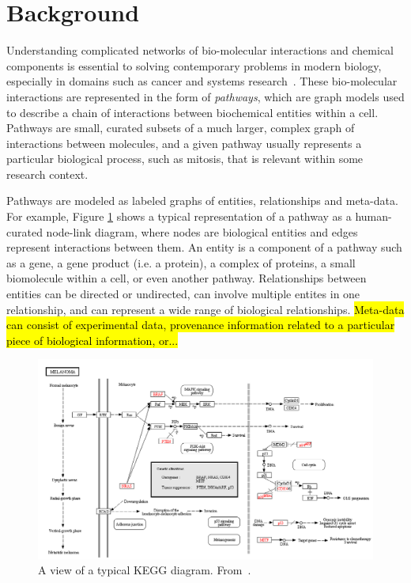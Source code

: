 \section*{Background}

Understanding complicated networks of bio-molecular interactions and chemical components is essential to solving contemporary problems in modern biology, especially in domains such as cancer and systems research~\cite{hanahan2011hallmarks}.
These bio-molecular interactions are represented in the form of \emph{pathways}, which are graph models used to describe a chain of interactions between biochemical entities within a cell.
Pathways are small, curated subsets of a much larger, complex graph of interactions between molecules, and a given pathway usually represents a particular biological process, such as mitosis, that is relevant within some research context.

Pathways are modeled as labeled graphs of entities, relationships and meta-data.
For example, Figure \ref{fig:kvik} shows a typical representation of a pathway as a human-curated node-link diagram, where nodes are biological entities and edges represent interactions between them.
An entity is a component of a pathway such as a gene, a gene product (i.e. a protein), a complex of proteins, a small biomolecule within a cell, or even another pathway.
Relationships between entities can be directed or undirected, can involve multiple entites in one relationship, and can represent a wide range of biological relationships.
\hl{Meta-data can consist of experimental data, provenance information related to a particular piece of biological information, or...}

\begin{figure}[htb]
  \centering
  \includegraphics[width=\linewidth]{figures/kegg2}
  \caption{\label{fig:kvik} A view of a typical KEGG diagram. From~\cite{Fjukstad2014kvik}.}
\end{figure}

